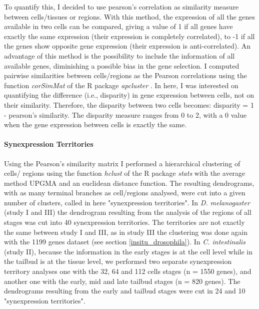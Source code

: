 To quantify this, I decided to use pearson's correlation as similarity measure between cells/tissues or regions. With this method, the expression of all the genes available in two cells can be compared, giving a value of 1 if all genes have exactly the same expression (their expression is completely correlated), to -1 if all the genes show opposite gene expression (their expression is anti-correlated). 
An advantage of this method is the possibility to include the information of all available genes, diminishing a possible bias in the gene selection. 
%
I computed pairwise similarities between cells/regions as the Pearson correlations using the function \textit{corSimMat} of the R package \textit{apcluster} \citep{Bodenhofer2011}. In here, I was interested on quantifying the difference (i.e., disparity) in gene expression between cells, not on their similarity. Therefore, the disparity between two cells becomes: disparity = 1 - pearson's similarity. The disparity measure ranges from 0 to 2, with a 0 value when the gene expression between cells is exactly the same.

\paragraph{Synexpression Territories} 

Using the Pearson's similarity matrix I performed a hierarchical clustering of cells/ regions using the function \textit{hclust} of the R package \textit{stats} \citep{RCoreTeam2014} with the average method UPGMA and an euclidean distance function. The resulting dendrograms, with as many terminal branches as cell/regions analysed, were cut into a given number of clusters, called in here "synexpression territories".
In \textit{D. melanogaster} (study I and III) the dendrogram resulting from the analysis of the regions of all stages was cut into 40 synexpression territories. The territories are not exactly the same between study I and III, as in study III the clustering was done again with the 1199 genes dataset (see section \ref{insitu_drosophila}).
In \textit{C. intestinalis} (study II), because the information in the early stages is at the cell level while in the tailbud is at the tissue level, we performed two separate synexpression territory analyses one with the 32, 64 and 112 cells stages (n = 1550 genes), and another one with the early, mid and late tailbud stages (n = 820 genes).
The dendrograms resulting from the early and tailbud stages were cut in 24 and 10 "synexpression territories".

